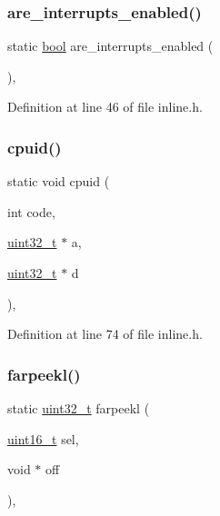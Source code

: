 \subsubsection{\texorpdfstring{are\+\_\+interrupts\+\_\+enabled()}{are\_interrupts\_enabled()}}
{\footnotesize\ttfamily static \hyperlink{a00023_af6a258d8f3ee5206d682d799316314b1_af6a258d8f3ee5206d682d799316314b1}{bool} are\+\_\+interrupts\+\_\+enabled (\begin{DoxyParamCaption}{ }\end{DoxyParamCaption})\hspace{0.3cm}{\ttfamily [inline]}, {\ttfamily [static]}}



Definition at line 46 of file inline.\+h.

\mbox{\label{a00026_adacb2a50c30267ac5314bfcb92ac1d85_adacb2a50c30267ac5314bfcb92ac1d85}} 
\subsubsection{\texorpdfstring{cpuid()}{cpuid()}}
{\footnotesize\ttfamily static void cpuid (\begin{DoxyParamCaption}\item[{int}]{code,  }\item[{\hyperlink{a00023_a435d1572bf3f880d55459d9805097f62_a435d1572bf3f880d55459d9805097f62}{uint32\+\_\+t} $\ast$}]{a,  }\item[{\hyperlink{a00023_a435d1572bf3f880d55459d9805097f62_a435d1572bf3f880d55459d9805097f62}{uint32\+\_\+t} $\ast$}]{d }\end{DoxyParamCaption})\hspace{0.3cm}{\ttfamily [inline]}, {\ttfamily [static]}}



Definition at line 74 of file inline.\+h.

\mbox{\label{a00026_aee0779a0581136320f91a72c4d6b5b90_aee0779a0581136320f91a72c4d6b5b90}} 
\subsubsection{\texorpdfstring{farpeekl()}{farpeekl()}}
{\footnotesize\ttfamily static \hyperlink{a00023_a435d1572bf3f880d55459d9805097f62_a435d1572bf3f880d55459d9805097f62}{uint32\+\_\+t} farpeekl (\begin{DoxyParamCaption}\item[{\hyperlink{a00023_a273cf69d639a59973b6019625df33e30_a273cf69d639a59973b6019625df33e30}{uint16\+\_\+t}}]{sel,  }\item[{void $\ast$}]{off }\end{DoxyParamCaption})\hspace{0.3cm}{\ttfamily [inline]}, {\ttfamily [static]}}



